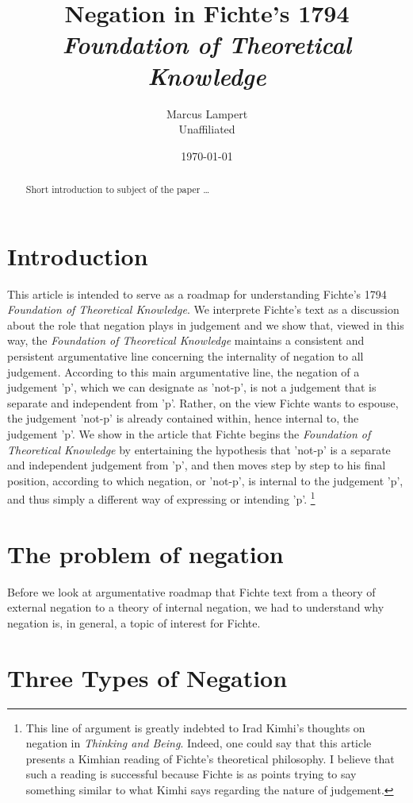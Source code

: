 \documentclass{article}
\title{Negation in Fichte's 1794 \textit{Foundation of Theoretical Knowledge}}
\author{Marcus Lampert  \\
	Unaffiliated\\
	}
\date{\today}
\begin{document}
\maketitle


\begin{abstract}
Short introduction to subject of the paper \ldots 
\end{abstract}

\section{Introduction}
This article is intended to serve as a roadmap for understanding Fichte's 1794 \textit{Foundation of Theoretical Knowledge}.
We interprete Fichte's text as a discussion about the role that negation plays in judgement and we show that, viewed in this way, the \textit{Foundation of Theoretical Knowledge} maintains a consistent and persistent argumentative line concerning the internality of negation to all judgement.
According to this main argumentative line, the negation of a judgement 'p', which we can designate as 'not-p', is not a judgement that is separate and independent from 'p'.
Rather, on the view Fichte wants to espouse, the judgement 'not-p' is already contained within, hence internal to, the judgement 'p'.
We show in the article that Fichte begins the \textit{Foundation of Theoretical Knowledge} by entertaining the hypothesis that 'not-p' is a separate and independent judgement from 'p', and then moves step by step to his final position, according to which negation, or 'not-p', is internal to the judgement 'p', and thus simply a different way of expressing or intending 'p'.
\footnote{This line of argument is greatly indebted to Irad Kimhi's thoughts on negation in \textit{Thinking and Being}.  Indeed, one could say that this article presents a Kimhian reading of Fichte's theoretical philosophy.  I believe that such a reading is successful because Fichte is as points trying to say something similar to what Kimhi says regarding the nature of judgement.}
\section{The problem of negation}
Before we look at argumentative roadmap that Fichte text from a theory of external negation to a theory of internal negation, we had to understand why negation is, in general, a topic of interest for Fichte. 
\section{Three Types of Negation}
\end{document}
